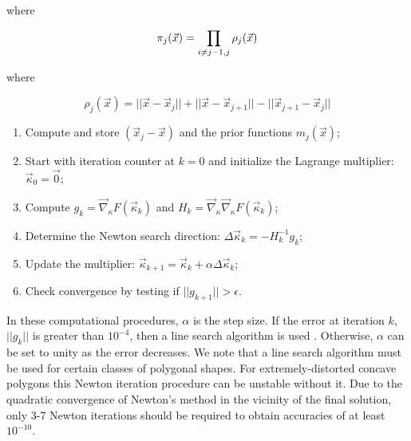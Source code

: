 \noindent where

\begin{equation}
\label{eq::BF_ME_prior_products}
\pi_j (\vec{x}) = \prod\displaylimits_{i \neq j-1, j} \rho_j (\vec{x})
\end{equation}

\noindent where

\begin{equation}
\label{eq::BF_ME_face_funcs}
\rho_j (\vec{x}) = || \vec{x} - \vec{x}_j || + || \vec{x} - \vec{x}_{j+1} || - || \vec{x}_{j+1} - \vec{x}_j ||
\end{equation}

\begin{enumerate}
\item Compute and store $(\vec{x}_j - \vec{x})$ and the prior functions $m_j (\vec{x})$;
\item Start with iteration counter at $k=0$ and initialize the Lagrange multiplier: $\vec{\kappa}_0 = \vec{0}$;
\item Compute $g_k = \vec{\nabla}_{\kappa} F (\vec{\kappa}_k)$ and $H_k = \vec{\nabla}_{\kappa} \vec{\nabla}_{\kappa}  F (\vec{\kappa}_k)$;
\item Determine the Newton search direction: $\Delta \vec{\kappa}_k = - H_k^{-1} g_k$;
\item Update the multiplier: $\vec{\kappa}_{k+1} =\vec{\kappa}_k + \alpha \Delta \vec{\kappa}_k$;
\item Check convergence by testing if $|| g_{k+1} || > \epsilon$.
\end{enumerate}

\noindent In these computational procedures, $\alpha$ is the step size. If the error at iteration $k$, $|| g_{k} || $ is greater than $10^{-4}$, then a line search algorithm is used \cite{burden2001numerical}. Otherwise, $\alpha$ can be set to unity as the error decreases. We note that a line search algorithm must be used for certain classes of polygonal shapes. For extremely-distorted concave polygons this Newton iteration procedure can be unstable without it. Due to the quadratic convergence of Newton's method in the vicinity of the final solution, only 3-7 Newton iterations should be required to obtain accuracies of at least $10^{-10}$. 



